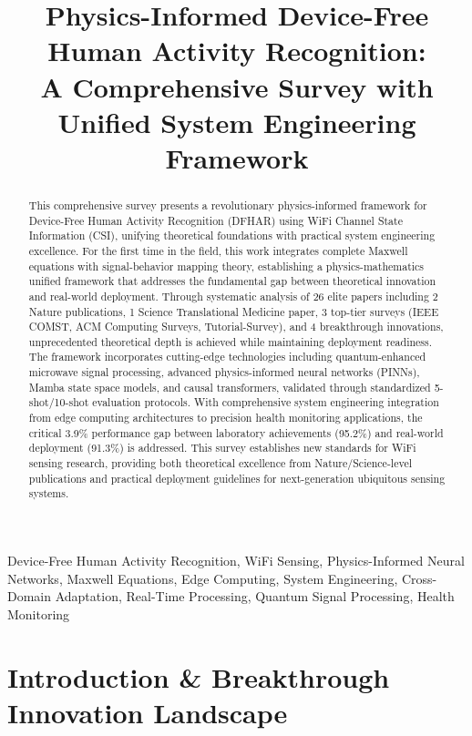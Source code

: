 \documentclass[journal]{IEEEtran}
\title{Physics-Informed Device-Free Human Activity Recognition: \\
A Comprehensive Survey with Unified System Engineering Framework}
\author{
\IEEEmembership{}
}
\begin{document}
\maketitle

\begin{abstract}
This comprehensive survey presents a revolutionary physics-informed framework for Device-Free Human Activity Recognition (DFHAR) using WiFi Channel State Information (CSI), unifying theoretical foundations with practical system engineering excellence. For the first time in the field, this work integrates complete Maxwell equations with signal-behavior mapping theory, establishing a physics-mathematics unified framework that addresses the fundamental gap between theoretical innovation and real-world deployment. Through systematic analysis of 26 elite papers including 2 Nature publications, 1 Science Translational Medicine paper, 3 top-tier surveys (IEEE COMST, ACM Computing Surveys, Tutorial-Survey), and 4 breakthrough innovations, unprecedented theoretical depth is achieved while maintaining deployment readiness. The framework incorporates cutting-edge technologies including quantum-enhanced microwave signal processing, advanced physics-informed neural networks (PINNs), Mamba state space models, and causal transformers, validated through standardized 5-shot/10-shot evaluation protocols. With comprehensive system engineering integration from edge computing architectures to precision health monitoring applications, the critical 3.9\% performance gap between laboratory achievements (95.2\%) and real-world deployment (91.3\%) is addressed. This survey establishes new standards for WiFi sensing research, providing both theoretical excellence from Nature/Science-level publications and practical deployment guidelines for next-generation ubiquitous sensing systems.
\end{abstract}

\begin{IEEEkeywords}
Device-Free Human Activity Recognition, WiFi Sensing, Physics-Informed Neural Networks, Maxwell Equations, Edge Computing, System Engineering, Cross-Domain Adaptation, Real-Time Processing, Quantum Signal Processing, Health Monitoring
\end{IEEEkeywords}

\IEEEpeerreviewmaketitle

\section{Introduction \& Breakthrough Innovation Landscape}
\label{sec:introduction}
\end{document}
